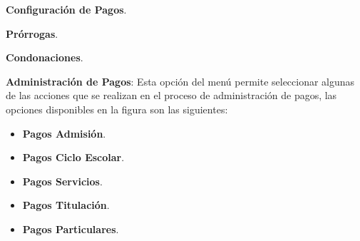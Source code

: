 \begin{Citemize}
	\item \textbf{Configuración de Pagos}.
	\item \textbf{Prórrogas}.
	\item \textbf{Condonaciones}.
	\item \textbf{Administración de Pagos}: Esta opción del menú permite seleccionar algunas de las acciones que se realizan en el proceso de administración de pagos, las opciones disponibles en la figura  son las siguientes:
	\begin{itemize}
		\item \textbf{Pagos Admisión}.
		\item \textbf{Pagos Ciclo Escolar}.
		\item \textbf{Pagos Servicios}.
		\item \textbf{Pagos Titulación}.
		\item \textbf{Pagos Particulares}.
	\end{itemize}	
	
\end{Citemize}
